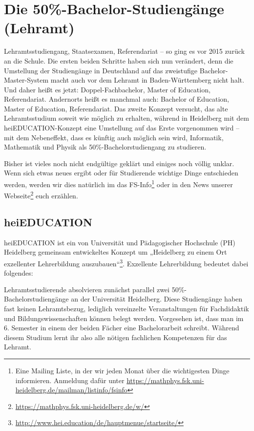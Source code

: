 \section{Die 50\%-Bachelor-Studiengänge (Lehramt)} %
\label{lehramt_allg}

Lehramtsstudiengang, Staatsexamen, Referendariat -- so ging es vor 2015 zurück an die Schule. Die ersten beiden Schritte haben sich nun verändert, denn die Umstellung der Studiengänge in Deutschland auf das zweistufige Bachelor-Master-System macht auch vor dem Lehramt in Baden-Württemberg nicht halt. Und daher heißt es jetzt: Doppel-Fachbachelor, Master of Education, Referendariat. Andernorts heißt es manchmal auch: Bachelor of Education, Master of Education, Referendariat. Das zweite Konzept versucht, das alte Lehramtsstudium soweit wie möglich zu erhalten, während in Heidelberg mit dem heiEDUCATION-Konzept eine Umstellung auf das Erste vorgenommen wird -- mit dem Nebeneffekt, dass es künftig auch möglich sein wird, Informatik, Mathematik und Physik als 50\%-Bachelorstudiengang zu studieren.

Bisher ist vieles noch nicht endgültige geklärt und einiges noch völlig unklar. Wenn sich etwas neues ergibt oder für Studierende wichtige Dinge entschieden werden, werden wir dies natürlich im das FS-Info\footnote{Eine Mailing Liste, in der wir jeden Monat über die wichtigesten Dinge informieren. Anmeldung dafür unter \url{https://mathphys.fsk.uni-heidelberg.de/mailman/listinfo/fsinfo}} oder in den News unserer Webseite\footnote{\url{https://mathphys.fsk.uni-heidelberg.de/w/}} euch erzählen.

\subsection{heiEDUCATION}

heiEDUCATION ist ein von Universität und Pädagogischer Hochschule (PH) Heidelberg gemeinsam entwickeltes Konzept um „Heidelberg zu einem Ort exzellenter Lehrerbildung auszubauen“\footnote{\url{http://www.hei.education/de/hauptmenue/startseite/}}. Exzellente Lehrerbildung bedeutet dabei folgendes:

Lehramtsstudierende absolvieren zunächst parallel zwei 50\%-Ba\-che\-lor\-stu\-di\-en\-gän\-ge an der Universität Heidelberg. Diese Studiengänge haben fast keinen Lehramtsbezug, lediglich vereinzelte Veranstaltungen für Fachdidaktik und Bildungswissenschaften können belegt werden. Vorgesehen ist, dass man im 6. Semester in einem der beiden Fächer eine Bachelorarbeit schreibt. Während diesem Studium lernt ihr also alle nötigen fachlichen Kompetenzen für das Lehramt.

